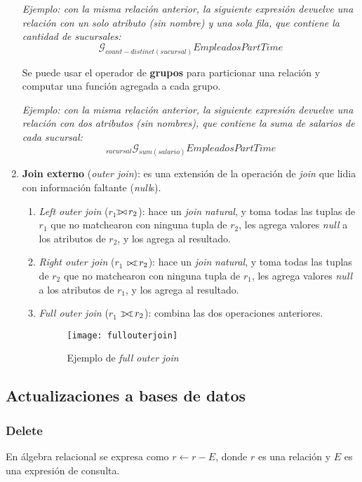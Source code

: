 \documentclass[a4paper, twoside]{article}
\def\ojoin{\setbox0=\hbox{$\bowtie$}%
  \rule[-.02ex]{.25em}{.4pt}\llap{\rule[\ht0]{.25em}{.4pt}}}
\def\leftouterjoin{\mathbin{\ojoin\mkern-5.8mu\bowtie}}
\def\rightouterjoin{\mathbin{\bowtie\mkern-5.8mu\ojoin}}
\def\fullouterjoin{\mathbin{\ojoin\mkern-5.8mu\bowtie\mkern-5.8mu\ojoin}}
\begin{document}
\begin{enumerate}
	\emph{Ejemplo: con la misma relación anterior, la siguiente expresión devuelve una relación con un solo atributo (sin nombre) y una sola fila, que contiene la cantidad de sucursales:}
	\[
		\mathcal{G}_{count-distinct(sucursal)}EmpleadosPartTime
	\]

	Se puede usar el operador de \textbf{grupos}\textbf{\emph{ }}para particionar una relación y computar una función agregada a cada grupo.

	\emph{Ejemplo: con la misma relación anterior, la siguiente expresión devuelve una relación con dos atributos (sin nombres), que contiene la suma de salarios de cada sucursal:}
	\[
		_{sucursal}\mathcal{G}_{sum(salario)}EmpleadosPartTime
	\]

	\item \textbf{Join externo} (\emph{outer join}): es una extensión de la operación de \emph{join} que lidia con información faltante (\emph{null}s).
	\begin{enumerate}
		\item \emph{Left outer join} (\textbf{$r_{1}$$ $$\leftouterjoin\, r_{2}$}): hace un \emph{join} \emph{natural}, y toma todas las tuplas de $r_{1}$ que no matchearon con ninguna tupla de $r_{2}$, les agrega valores \emph{null} a los atributos de $r_{2}$, y los agrega al resultado.
		\item \emph{Right outer join} (\textbf{$r_{1}$ $\rightouterjoin\, r_{2}$}): hace un \emph{join} \emph{natural}, y toma todas las tuplas de $r_{2}$ que no matchearon con ninguna tupla de $r_{1}$, les agrega valores \emph{null} a los atributos de $r_{1}$, y los agrega al resultado.
		\item \emph{Full outer join} (\textbf{$r_{1}$ $\fullouterjoin\, r_{2}$}): combina las dos operaciones anteriores.
		\begin{figure}[H]
			\centering
			\texttt{[image: fullouterjoin]}
			\caption{Ejemplo de \emph{full outer join}}
		\end{figure}
	\end{enumerate}
\end{enumerate}

\subsection{Actualizaciones a bases de datos}
\subsubsection{Delete}
En álgebra relacional se expresa como $r\leftarrow r-E$, donde $r$ es una relación y $E$ es una expresión de consulta.
\end{document}
